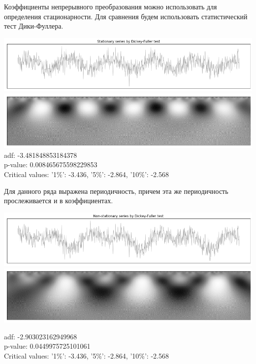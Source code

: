 \documentclass[a4paper]{article}
\begin{document}
	Коэффициенты непрерывного преобразования можно использовать для определения стационарности. Для сравнения будем использовать статистический тест Дики-Фуллера.
	
	\begin{center}
		\includegraphics[scale=0.5]{./output_9_0.png}
		\includegraphics[scale=0.5]{./output_9_1.png}
		adf: -3.481848853184378 \\
		p-value: 0.008465675598229853 \\
		Critical values: {'1\%': -3.436, '5\%': -2.864, '10\%':
			-2.568}
	\end{center}

	Для данного ряда выражена периодичность, причем эта же периодичность прослеживается и в коэффициентах.
	
	\vspace{2em}
	
	\begin{center}
		\includegraphics[scale=0.45]{./output_10_0.png}
		\includegraphics[scale=0.45]{./output_10_1.png}
		
		adf: -2.903023162949968 \\
		p-value: 0.0449975725101061 \\
		Critical values: {'1\%': -3.436, '5\%': -2.864, '10\%':
			-2.568}
	\end{center}
\end{document}
